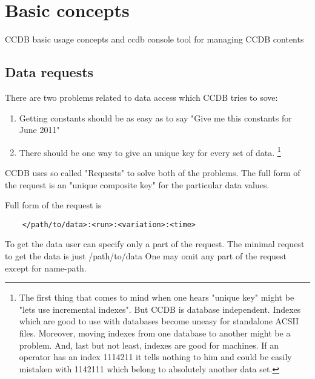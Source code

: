 \documentclass{article}
\begin{document}
\newpage
\section{Basic concepts}\label{sec:basic_concepts}

CCDB basic usage concepts and ccdb console tool for managing CCDB contents


\subsection{Data requests}

There are two problems related to data access which CCDB tries to sove:
\begin{enumerate}
  \item Getting constants should be as easy as to say 
        "Give me this constants for June 2011"

  \item There should be one way to give an unique key for every set of data.
  \footnote{
    The first thing that comes to mind when one hears "unique key" might be
    "lets use incremental indexes". But CCDB is database independent. Indexes
    which are good to use with databases become uneasy for standalone ACSII 
    files. Moreover, moving indexes from one database to another might be a 
    problem. And, last but not least, indexes are good for machines. If an 
    operator has an index 1114211 it tells nothing to him and could be easily
    mistaken with 1142111 which belong to absolutely another data set.
  }
\end{enumerate}
\vspace{1 em}

CCDB uses so called "Requests" to solve both of the problems.
The full form of the request is an "unique composite key" for
the particular data values.

Full form of the request is
\begin{verbatim}
    </path/to/data>:<run>:<variation>:<time>
\end{verbatim}
\vspace{1 em}

To get the data user can specify only a part of the request.
The minimal request to get the data is just /path/to/data
One may omit any part of the request except for name-path.
\end{document}
